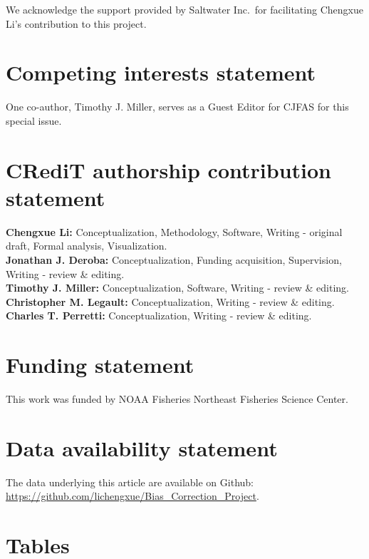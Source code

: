 \documentclass[
  12pt,
]{article}
\begin{document}
We acknowledge the support provided by Saltwater Inc.~for facilitating
Chengxue Li's contribution to this project.

\hypertarget{competing-interests-statement}{%
\section{Competing interests
statement}\label{competing-interests-statement}}

One co-author, Timothy J. Miller, serves as a Guest Editor for CJFAS for
this special issue.

\hypertarget{credit-authorship-contribution-statement}{%
\section{CRediT authorship contribution
statement}\label{credit-authorship-contribution-statement}}

\textbf{Chengxue Li:} Conceptualization, Methodology, Software, Writing
- original draft, Formal analysis, Visualization.\\
\textbf{Jonathan J. Deroba:} Conceptualization, Funding acquisition,
Supervision, Writing - review \& editing.\\
\textbf{Timothy J. Miller:} Conceptualization, Software, Writing -
review \& editing.\\
\textbf{Christopher M. Legault:} Conceptualization, Writing - review \&
editing.\\
\textbf{Charles T. Perretti:} Conceptualization, Writing - review \&
editing.

\hypertarget{funding-statement}{%
\section{Funding statement}\label{funding-statement}}

This work was funded by NOAA Fisheries Northeast Fisheries Science
Center.

\hypertarget{data-availability-statement}{%
\section{Data availability
statement}\label{data-availability-statement}}

The data underlying this article are available on Github:
\url{https://github.com/lichengxue/Bias_Correction_Project}.

\hypertarget{tables}{%
\section{Tables}\label{tables}}
\end{document}
